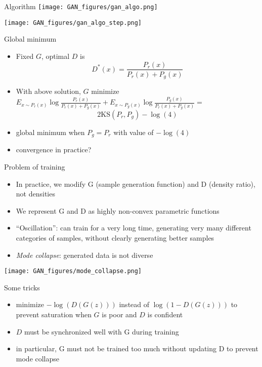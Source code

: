 \documentclass[9pt]{beamer}
\begin{document}
\begin{frame}{Algorithm}
    \texttt{[image: GAN\_figures/gan\_algo.png]}

    \texttt{[image: GAN\_figures/gan\_algo\_step.png]}
\end{frame}

\begin{frame}{Global minimum}
  \begin{itemize}
  \item Fixed $G$, optimal $D$ is $$ D^*(x)=\frac{P_r(x)}{P_r(x)+P_g(x)}$$
  \item With above solution, $G$ minimize $E_{x \sim P_r (x)} \log
    \frac{P_r (x)}{P_r (x) + P_g (x)} + E_{x \sim P_g (x)} \log
    \frac{P_g (x)}{P_r (x) + P_g (x)}=$
    $$2 \text{KS} (P_r, P_g) - \log (4) $$
  \item global minimum when $P_g=P_r$ with value of $-\log(4)$
  \item convergence in practice?
  \end{itemize}
\end{frame}

\begin{frame}{Problem of training}
  \begin{itemize}
  \item
      In practice, we modify G (sample generation function) and D
      (density ratio), not densities
  \item
      We represent G and D as highly non-convex parametric functions
  \item
    “Oscillation”: can train for a very long time, generating very many
    different categories of samples, without clearly generating better samples
  \item \emph{Mode collapse}: generated data is not diverse
  \end{itemize}
  \texttt{[image: GAN\_figures/mode\_collapse.png]}
\end{frame}
\begin{frame}{Some tricks}
  \begin{itemize}
  \item minimize $-\log(D(G(z)))$ instead of $\log(1-D(G(z)))$ to
    prevent saturation when $G$ is poor and $D$ is confident
  \item
    $D$ must be synchronized well with G during training
  \item
    in particular, G must not be trained too much without updating D
    to prevent mode collapse
  \end{itemize}
\end{frame}
\end{document}
